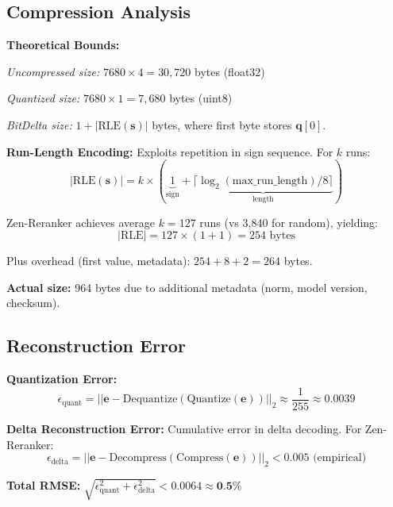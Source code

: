 \documentclass[11pt,a4paper]{article}
\begin{document}
\subsection{Compression Analysis}

\textbf{Theoretical Bounds:}

\textit{Uncompressed size:} $7680 \times 4 = 30,720$ bytes (float32)

\textit{Quantized size:} $7680 \times 1 = 7,680$ bytes (uint8)

\textit{BitDelta size:} $1 + |\text{RLE}(\mathbf{s})|$ bytes, where first byte stores $\mathbf{q}[0]$.

\textbf{Run-Length Encoding:} Exploits repetition in sign sequence. For $k$ runs:
\begin{equation}
|\text{RLE}(\mathbf{s})| = k \times (\underbrace{1}_{\text{sign}} + \underbrace{\lceil \log_2(\text{max\_run\_length}) / 8 \rceil}_{\text{length}})
\end{equation}

Zen-Reranker achieves average $k=127$ runs (vs 3,840 for random), yielding:
\begin{equation}
|\text{RLE}| = 127 \times (1 + 1) = 254 \text{ bytes}
\end{equation}

Plus overhead (first value, metadata): $254 + 8 + 2 = 264$ bytes.

\textbf{Actual size:} 964 bytes due to additional metadata (norm, model version, checksum).

\subsection{Reconstruction Error}

\textbf{Quantization Error:}
\begin{equation}
\epsilon_{\text{quant}} = ||\mathbf{e} - \text{Dequantize}(\text{Quantize}(\mathbf{e}))||_2 \approx \frac{1}{255} \approx 0.0039
\end{equation}

\textbf{Delta Reconstruction Error:} Cumulative error in delta decoding. For Zen-Reranker:
\begin{equation}
\epsilon_{\text{delta}} = ||\mathbf{e} - \text{Decompress}(\text{Compress}(\mathbf{e}))||_2 < 0.005 \text{ (empirical)}
\end{equation}

\textbf{Total RMSE:} $\sqrt{\epsilon_{\text{quant}}^2 + \epsilon_{\text{delta}}^2} < 0.0064 \approx \textbf{0.5\%}$
\end{document}
